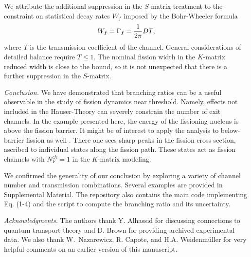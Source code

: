 \documentclass[prl,aps,floatfix,nofootinbib,preprint]{revtex4}
\def\be{\begin{equation}}
\def\ee{\end{equation}}
\begin{document}
We attribute the additional suppression in the $S$-matrix treatment to
the constraint on statistical decay rates $W_f$ imposed by 
the Bohr-Wheeler
formula \cite{bo39}
\be
W_f = \Gamma_f = {1\over 2 \pi} D T,
\ee
where $T$ is the transmission coefficient of the channel.
General considerations of detailed balance require 
$T \le 1$. The
nominal fission width in the $K$-matrix reduced width is close to the
bound, so
it is not unexpected that there is a further suppression in the $S$-matrix.


{\it Conclusion.}  We have demonstrated that branching ratios can be a
useful observable
in the study of fission dynamics near threshold.  Namely, effects not
included in the Hauser-Theory can severely constrain the number of exit 
channels.  In the example presented
here, the energy of the fissioning nucleus is above the fission barrier.
It might be of interest to apply the analysis to below-barrier fission
as well {\cite{bo13}}.
There one sees sharp peaks in the fission cross section, ascribed to
individual states along the fission path.  These states act as fission
channels with $N^{ch}_F = 1$ in the $K$-matrix modeling.

We confirmed the generality of our conclusion by exploring a variety of
channel number and transmission combinations.  Several examples are
provided in Supplemental Material.  The repository also contains
the main code implementing Eq. (1-4) and the script to compute
the branching ratio and its uncertainty. 


{\it Acknowledgments.}  
The authors thank Y. Alhassid 
for discussing connections to quantum transport
theory and D. Brown for providing archived experimental data.  We also
thank W.~Nazarewicz, R. Capote, and H.A. Weidenm\"uller for very helpful
comments on an earlier version of this manuscript.
\end{document}
